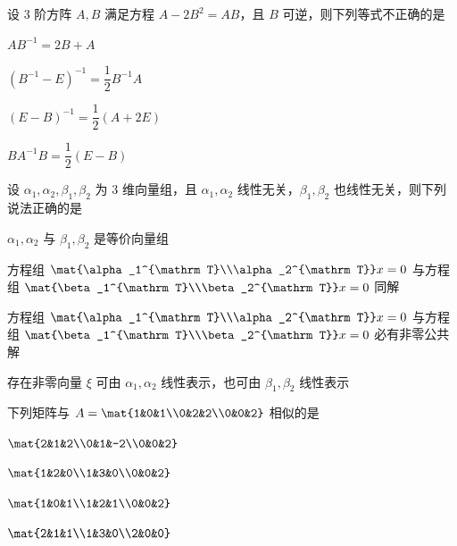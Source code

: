 \begin{question}[index=5]
设 $3$ 阶方阵 $A,B$ 满足方程 $A-2B^2=AB$，且 $B$ 可逆，则下列等式不正确的是
\begin{choices}[columns=2]
\item $AB^{-1}=2B+A$
\item $(B^{-1}-E)^{-1}=\dfrac12B^{-1}A$
\item $(E-B)^{-1}=\dfrac12(A+2E)$
\item $BA^{-1}B=\dfrac12(E-B)$
\end{choices}
\end{question}
\QuestionBreak

\begin{question}[index=6]
设 $\alpha_1,\alpha_2,\beta_1,\beta_2$ 为 $3$ 维向量组，且 $\alpha_1,\alpha_2$ 线性无关，$\beta_1,\beta_2$ 也线性无关，则下列说法正确的是
\begin{choices}[columns=1]
\item $\alpha_1,\alpha_2$ 与 $\beta_1,\beta_2$ 是等价向量组
\item 方程组 $\mat{\alpha_1^{\mathrm T}\\\alpha_2^{\mathrm T}}x=0$ 与方程组 $\mat{\beta_1^{\mathrm T}\\\beta_2^{\mathrm T}}x=0$ 同解
\item 方程组 $\mat{\alpha_1^{\mathrm T}\\\alpha_2^{\mathrm T}}x=0$ 与方程组 $\mat{\beta_1^{\mathrm T}\\\beta_2^{\mathrm T}}x=0$ 必有非零公共解
\item 存在非零向量 $\xi$ 可由 $\alpha_1,\alpha_2$ 线性表示，也可由 $\beta_1,\beta_2$ 线性表示
\end{choices}
\end{question}
\QuestionBreak

\begin{question}[index=7]
下列矩阵与 $A=\mat{1&0&1\\0&2&2\\0&0&2}$ 相似的是
\begin{choices}[columns=4]
\item $\mat{2&1&2\\0&1&-2\\0&0&2}$
\item $\mat{1&2&0\\1&3&0\\0&0&2}$
\item $\mat{1&0&1\\1&2&1\\0&0&2}$
\item $\mat{2&1&1\\1&3&0\\2&0&0}$
\end{choices}
\end{question}
\QuestionBreak

